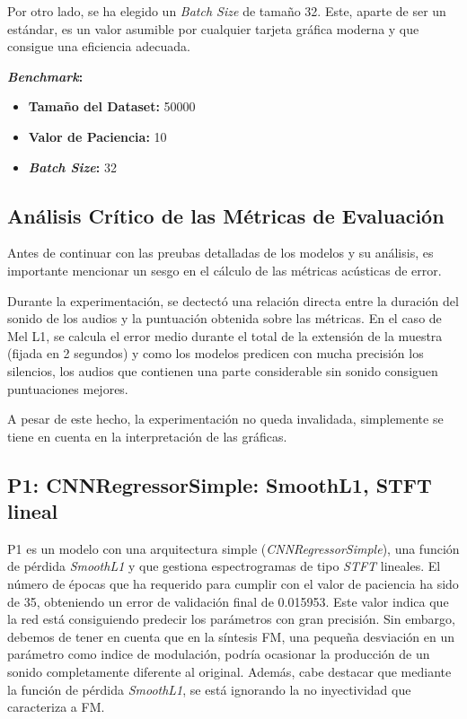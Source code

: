 Por otro lado, se ha elegido un \textit{Batch Size} de tamaño 32. Este, aparte de ser un estándar, es un valor asumible por cualquier tarjeta gráfica moderna y que consigue una eficiencia adecuada. 

\noindent \textbf{\textit{Benchmark}:}
\begin{itemize}
    \item \textbf{Tamaño del Dataset: }50000
    \item \textbf{Valor de Paciencia: }10 
    \item \textbf{\textit{Batch Size}: }32
\end{itemize}

\subsection{Análisis Crítico de las Métricas de Evaluación}
Antes de continuar con las preubas detalladas de los modelos y su análisis, es importante mencionar un sesgo en el cálculo de las métricas acústicas de error.

Durante la experimentación, se dectectó una relación directa entre la duración del sonido de los audios y la puntuación obtenida sobre las métricas. En el caso de Mel L1, se calcula el error medio durante el total de la extensión de la muestra (fijada en 2 segundos) y como los modelos predicen con mucha precisión los silencios, los audios que contienen una parte considerable sin sonido consiguen puntuaciones mejores.

A pesar de este hecho, la experimentación no queda invalidada, simplemente se tiene en cuenta en la interpretación de las gráficas.

\subsection{P1: CNNRegressorSimple: SmoothL1, STFT lineal}
P1 es un modelo con una arquitectura simple (\textit{CNNRegressorSimple}), una función de pérdida \textit{SmoothL1} y que gestiona espectrogramas de tipo \textit{STFT} lineales. El número de épocas que ha requerido para cumplir con el valor de paciencia ha sido de 35, obteniendo un error de validación final de 0.015953. Este valor indica que la red está consiguiendo predecir los parámetros con gran precisión. Sin embargo, debemos de tener en cuenta que en la síntesis FM, una pequeña desviación en un parámetro como indice de modulación, podría ocasionar la producción de un sonido completamente diferente al original. Además, cabe destacar que mediante la función de pérdida \textit{SmoothL1}, se está ignorando la no inyectividad que caracteriza a FM. 

